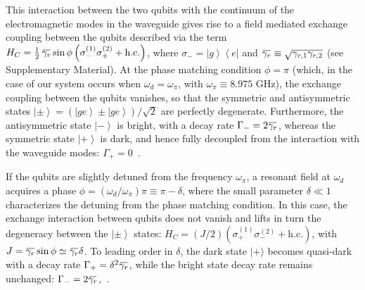 \documentclass[pra, twocolumn, amsmath, amssymb, notitlepage, longbibliography, showpacs, superscriptaddress]{revtex4-1}
\newcommand{\bra}[1]{\ensuremath{\left\langle #1\r|}}
\newcommand{\ket}[1]{\ensuremath{\left|#1\r\rangle}}
\newcommand{\HC}{\textrm{h.c.}}
\renewcommand{\r}[0]{\right}
\newcommand{\overbar}[1]{\mkern 1.5mu\overline{\mkern-1.5mu#1\mkern-1.5mu}\mkern 1.5mu}
\begin{document}

This interaction between the two qubits with the continuum of 
the electromagnetic modes in the waveguide gives rise to
a field mediated exchange coupling between the qubits described via the term~\cite{Lalumiere2013}  
$H_C = \tfrac{1}{2}\,\overbar{\gamma_r} \sin\phi\left(\sigma_{-}^{(1)}\sigma_{+}^{(2)}+\HC\right)$, 
where $\sigma_{-}=\ket{g}\bra{e}$ and $\overbar{\gamma_r}\equiv\sqrt{\gamma_{r,1} \gamma_{r,2}}$
(see Supplementary Material).
At the phase matching condition $\phi=\pi$
(which, in the case of our system occurs when $\omega_d = \omega_\pi$,
with $\omega_\pi \equiv 8.975\textrm{ GHz}$),
the exchange coupling between the qubits vanishes, so that the symmetric and antisymmetric states 
$\ket{\pm} = \left(\ket{ge} \pm \ket{ge}\right)/\sqrt{2}$ are perfectly degenerate.
Furthermore, the antisymmetric state $\ket{-}$ is bright,
with a decay rate $\Gamma_-=2\overbar{\gamma_r}$, 
whereas the symmetric state $\ket{+}$ is dark, and hence fully decoupled from 
the interaction with the waveguide modes: $\Gamma_+=0$~\cite{Lalumiere2013}.

If the qubits are slightly detuned from the frequency $\omega_\pi$, 
a resonant field at $\omega_d$ acquires a phase $\phi=(\omega_d/\omega_\pi)\pi\equiv\pi-\delta$, where  the 
small parameter $\delta \ll 1$ characterizes the detuning from the phase matching condition. 
In this case, the exchange interaction between qubits does not vanish and 
lifts in turn the degeneracy between the $\ket{\pm}$  states: 
$H_C=(J/2)(\sigma_+^{(1)}\sigma_-^{(2)}+\HC)$,
with $J=\overbar{\gamma_r} \sin\phi\simeq \overbar{\gamma_r} \delta$. 
To leading order in $\delta$, the dark state $|+\rangle$ becomes quasi-dark 
with a decay rate $\Gamma_+=\delta^2 \overbar{\gamma_r}$, while 
the bright state decay rate remains unchanged: $\Gamma_-=2\overbar{\gamma_r}$,~\cite{Redchenko2014,Muller2017a}. 
\end{document}
